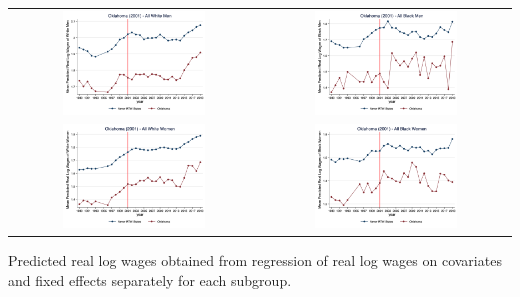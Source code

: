 \documentclass[11pt]{article}
\begin{document}
{\pagebreak
\begin{landscape}
\begin{table}[h!]
    \centering
    \label{fig:pta_ok}
    \begin{tabular}{c c}
          \includegraphics[width = 0.6\textwidth, keepaspectratio]{figures/pta/fin_wm_ok.png} & \includegraphics[width = 0.6\textwidth, keepaspectratio]{figures/pta/fin_bm_ok.png} \\
          \includegraphics[width = 0.6\textwidth, keepaspectratio]{figures/pta/fin_wf_ok.png} & \includegraphics[width = 0.6\textwidth, keepaspectratio]{figures/pta/fin_bf_ok.png}
    \end{tabular}
\end{table}
\footnotesize{Predicted real log wages obtained from regression of real log wages on covariates and fixed effects separately for each subgroup.}
\end{landscape}

}
\end{document}

